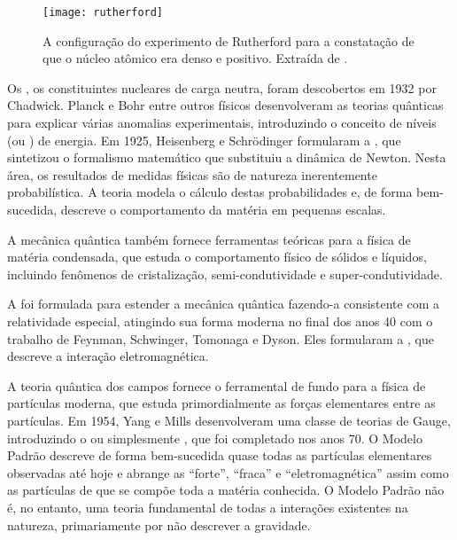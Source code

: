 \begin{figure}
\begin{center}
\texttt{[image: rutherford]}
\end{center}
\caption[O  de Rutherford.]{A configuração do experimento de
Rutherford para a constatação de que o núcleo atômico era denso e
positivo. Extraída de \cite{partadv}.}
\label{fig:rutherford}
\end{figure}

Os , os constituintes nucleares de carga neutra, foram
descobertos em 1932 por Chadwick. Planck e Bohr entre outros físicos
desenvolveram as teorias quânticas para explicar várias anomalias
experimentais, introduzindo o conceito de níveis (ou ) de
energia. Em 1925, Heisenberg e Schrödinger formularam a , que sintetizou o formalismo matemático que substituiu a dinâmica de
Newton. Nesta área, os resultados de medidas físicas são de natureza
inerentemente probabilística. A teoria modela o cálculo destas probabilidades
e, de forma bem-sucedida, descreve o comportamento da matéria em pequenas
escalas.

A mecânica quântica tam\-bém fornece ferramentas te\-ó\-ri\-cas para a
fí\-si\-ca de ma\-té\-ria condensada, que estuda o comportamento físico de
sólidos e líquidos, incluindo fenômenos de cristalização, semi-condutividade e
super-condutividade.

A  foi formulada para estender a mecânica
quântica fazendo-a consistente com a relatividade especial, atingindo sua
forma moderna no final dos anos 40 com o trabalho de Feynman, Schwinger,
Tomonaga e Dyson. Eles formularam a , que
descreve a interação eletromagnética.

A teoria quântica dos campos fornece o ferramental de fundo para a fí\-si\-ca
de par\-tí\-cu\-las moderna, que estuda primordialmente as forças elementares
entre as partículas. Em 1954, Yang e Mills desenvolveram uma classe de teorias
de Gauge, introduzindo o  ou simplesmente
, que foi completado nos anos 70. O Modelo Padrão descreve
de forma bem-sucedida quase todas as partículas elementares observadas até
hoje e abrange as  ``forte'', ``fraca'' e
``eletromagnética'' assim como as partículas de que se compõe toda a matéria
conhecida. O Modelo Padrão não é, no entanto, uma teoria fundamental de todas
a interações existentes na natureza, primariamente por não descrever a
gravidade.


